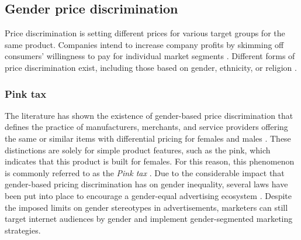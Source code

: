 \documentclass[twocolumn]{bmcart}\usepackage{lineno}
\begin{document}



\subsection{Gender price discrimination}
Price discrimination is setting different prices for various target groups for the same product. Companies intend to increase company profits by skimming off consumers' willingness to pay for individual market segments \cite{varian1989price}. Different forms of price discrimination exist, including those based on gender, ethnicity, or religion \cite{varian1989price}.

\subsubsection{Pink tax}

The literature has shown the existence of gender-based price discrimination that defines the practice of manufacturers, merchants, and service providers offering the same or similar items with differential pricing for females and males \cite{guittar2022beyond,duesterhaus2011cost,abdou2019gender}. These distinctions are solely for simple product features, such as the pink, which indicates that this product is built for females. For this reason,
this phenomenon is commonly referred to as the \emph{Pink tax} \cite{lafferty2019pink}.
Due to the considerable impact that gender-based pricing discrimination has on gender inequality, several laws have been put into place to encourage a gender-equal advertising ecosystem  \cite{tregouet2015gender}. 
Despite the imposed limits on gender stereotypes in advertisements, marketers can still target internet audiences by gender and implement gender-segmented marketing strategies. 
\end{document}

